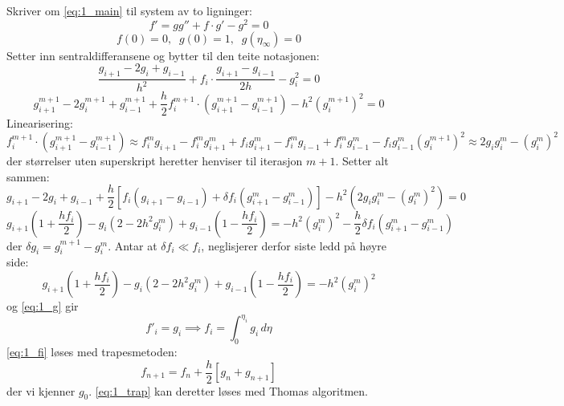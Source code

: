 \noindent Skriver om \eqref{eq:1_main} til system av to ligninger:
\begin{subequations}
\begin{equation}
  f' = g \label{eq:1_g}
\end{equation}
\begin{equation}
  g'' + f \cdot g' - g^2 = 0
\end{equation}
\end{subequations}
\begin{equation}
  \tag{b}
  f(0) = 0, \;\; g(0) = 1, \;\; g(\eta_\infty) = 0
\end{equation}
Setter inn sentraldifferansene og bytter til den teite notasjonen:
\begin{equation*}
  \frac{g_{i+1} - 2g_i + g_{i-1}}{h^2} +
  f_i \cdot \frac{g_{i+1} - g_{i-1}}{2h} -
  g_i^2 = 0
\end{equation*}
\begin{equation}
  g_{i+1}^{m+1} - 2g_i^{m+1} + g_{i-1}^{m+1} +
  \frac{h}{2} f_i^{m+1} \cdot (g_{i+1}^{m+1} - g_{i-1}^{m+1}) -
  h^2(g_i^{m+1})^2 = 0
\end{equation}
Linearisering:
\begin{subequations}
\begin{equation}
  f_i^{m+1} \cdot (g_{i+1}^{m+1} - g_{i-1}^{m+1}) \approx
  f_i^m g_{i+1} - f_i^m g_{i+1}^m + f_i g_{i+1}^m - f_i^m g_{i-1} + f_i^m g_{i-1}^m - f_i g_{i-1}^m
\end{equation}
\begin{equation}
  (g_i^{m+1})^2 \approx 2g_i g_i^m - (g_i^m)^2
\end{equation}
\end{subequations}
der størrelser uten superskript heretter henviser til iterasjon $m+1$. Setter alt sammen:
\begin{equation}
  g_{i+1} - 2g_i + g_{i-1} +
  \frac{h}{2} \left[ f_i(g_{i+1}-g_{i-1}) + \delta f_i (g_{i+1}^m - g_{i-1}^m) \right] -
  h^2 (2g_i g_i^m - (g_i^m)^2) = 0
\end{equation}
\begin{equation}
  g_{i+1} \left( 1 + \frac{hf_i}{2} \right) -
  g_i (2 - 2 h^2 g_i^m) +
  g_{i-1} \left( 1 - \frac{hf_i}{2} \right)
  =  - h^2 (g_i^m)^2 - \frac{h}{2} \delta f_i (g_{i+1}^m - g_{i-1}^m)
\end{equation}
der $\delta g_i = g_i^{m+1}-g_i^m$. Antar at $\delta f_i \ll f_i$, neglisjerer derfor siste ledd på høyre side:
\begin{equation}
  g_{i+1} \left( 1 + \frac{hf_i}{2} \right) -
  g_i (2- 2 h^2 g_i^m) +
  g_{i-1} \left( 1 - \frac{hf_i}{2} \right)
  = - h^2 (g_i^m)^2 \label{eq:1_trap}
\end{equation}
og \eqref{eq:1_g} gir
\begin{equation}
  f'_i = g_i \implies f_i = \int_0^{\eta_i} g_i \, d\eta \label{eq:1_fi}
\end{equation}
\eqref{eq:1_fi} løses med trapesmetoden:
\begin{equation}
  f_{n+1} = f_n + \frac{h}{2} \left[ g_n + g_{n+1} \right]
\end{equation}
der vi kjenner $g_0$. \eqref{eq:1_trap} kan deretter løses med Thomas algoritmen.

